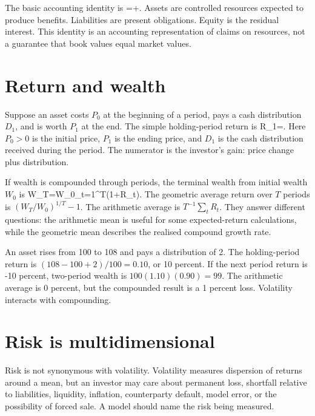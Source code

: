 The basic accounting identity is
  =+.
\closeformula
Assets are controlled resources expected to produce benefits. Liabilities are present obligations. Equity is the residual interest. This identity is an accounting representation of claims on resources, not a guarantee that book values equal market values.

\section{Return and wealth}
Suppose an asset costs $P_0$ at the beginning of a period, pays a cash distribution $D_1$, and is worth $P_1$ at the end. The simple holding-period return is
  R_1=.
\closeformula
Here $P_0>0$ is the initial price, $P_1$ is the ending price, and $D_1$ is the cash distribution received during the period. The numerator is the investor's gain: price change plus distribution.

If wealth is compounded through periods, the terminal wealth from initial wealth $W_0$ is
  W_T=W_0\prod_{t=1}^{T}(1+R_t).
\closeformula
The geometric average return over $T$ periods is $\left(W_T/W_0\right)^{1/T}-1$. The arithmetic average is $T^{-1}\sum_tR_t$. They answer different questions: the arithmetic mean is useful for some expected-return calculations, while the geometric mean describes the realised compound growth rate.

\begin{worked}
An asset rises from 100 to 108 and pays a distribution of 2. The holding-period return is $(108-100+2)/100=0.10$, or 10 percent. If the next period return is -10 percent, two-period wealth is $100(1.10)(0.90)=99$. The arithmetic average is 0 percent, but the compounded result is a 1 percent loss. Volatility interacts with compounding.
\end{worked}

\section{Risk is multidimensional}
Risk is not synonymous with volatility. Volatility measures dispersion of returns around a mean, but an investor may care about permanent loss, shortfall relative to liabilities, liquidity, inflation, counterparty default, model error, or the possibility of forced sale. A model should name the risk being measured.

